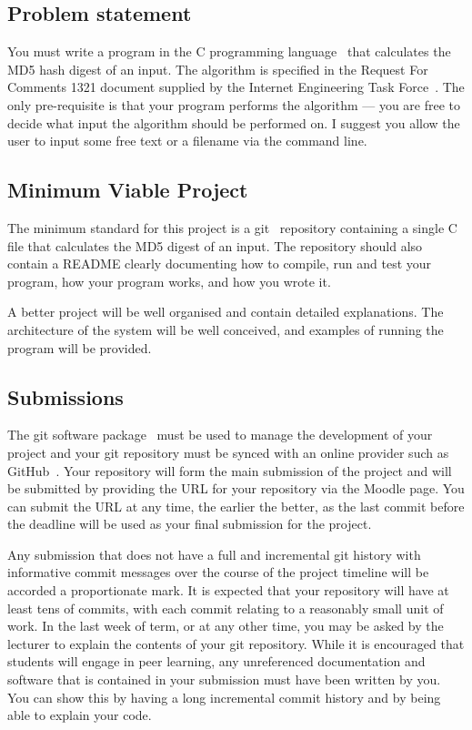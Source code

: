 \documentclass[12pt, a4paper]{article}
\begin{document}
\subsection*{Problem statement}
You must write a program in the C programming language~\cite{cstandard} that calculates the MD5 hash digest of an input.
The algorithm is specified in the Request For Comments 1321 document supplied by the Internet Engineering Task Force~\cite{md5}.
The only pre-requisite is that your program performs the algorithm --- you are free to decide what input the algorithm should be performed on.
I suggest you allow the user to input some free text or a filename via the command line.


\subsection*{Minimum Viable Project}
The minimum standard for this project is a git~\cite{git} repository containing a single C file that calculates the MD5 digest of an input.
The repository should also contain a README clearly documenting how to compile, run and test your program, how your program works, and how you wrote it.

A better project will be well organised and contain detailed explanations.
The architecture of the system will be well conceived, and examples of running the program will be provided.


\subsection*{Submissions}
The git software package~\cite{git} must be used to manage the development of your project and your git repository must be synced with an online provider such as GitHub~\cite{github}.
Your repository will form the main submission of the project and will be submitted by providing the URL for your repository via the Moodle page.
You can submit the URL at any time, the earlier the better, as the last commit before the deadline will be used as your final submission for the project.

Any submission that does not have a full and incremental git history with informative commit messages over the course of the project timeline will be accorded a proportionate mark.
It is expected that your repository will have at least tens of commits, with each commit relating to a reasonably small unit of work.
In the last week of term, or at any other time, you may be asked by the lecturer to explain the contents of your git repository.
While it is encouraged that students will engage in peer learning, any unreferenced documentation and software that is contained in your submission must have been written by you.
You can show this by having a long incremental commit history and by being able to explain your code.
\end{document}
